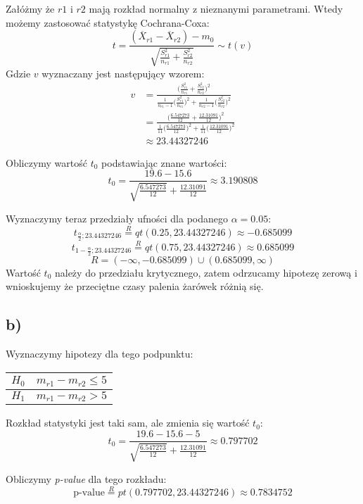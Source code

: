 \documentclass{article}
\begin{document}
Załóżmy że $r1$ i $r2$ mają rozkład normalny z nieznanymi parametrami. Wtedy możemy zastosować statystykę Cochrana-Coxa:
\[ t = \frac{(\overline{X}_{r1} - \overline{X}_{r2}) - m_0}{\sqrt{ \frac{S_{r1}^2}{n_{r1}} + \frac{S_{r2}^2}{n_{r2}} }} \sim t(v) \]
Gdzie $v$ wyznaczany jest następujący wzorem:
\begin{align*}
v & = \frac{ \Big( \frac{S_{r1}^2}{n_{r1}} + \frac{S_{r2}^2}{n_{r2}} \Big)^2 }{\frac{1}{n_{r1}-1} \Big( \frac{S_{r1}^2}{n_{r1}} \Big)^2 + \frac{1}{n_{r2}-1} \Big( \frac{S_{r2}^2}{n_{r2}} \Big)^2 } \\
& = \frac{ \Big( \frac{6.547273}{12} + \frac{12.31091}{12} \Big)^2 }{\frac{1}{11} \Big( \frac{6.547273}{12} \Big)^2 + \frac{1}{11} \Big( \frac{12.31091}{12} \Big)^2 } \\
& \approx 23.44327246
\end{align*}

Obliczymy wartość $t_0$ podstawiając znane wartości:
\[ t_0 = \frac{19.6 - 15.6}{\sqrt{ \frac{6.547273}{12}} + \frac{12.31091}{12}}  \approx 3.190808 \]

Wyznaczymy teraz przedziały ufności dla podanego $\alpha = 0.05$:
\[ t_{\frac{\alpha}{2};23.44327246} \overset{R}{=} qt(0.25, 23.44327246) \approx -0.685099 \]
\[ t_{1 - \frac{\alpha}{2}; 23.44327246} \overset{R}{=} qt(0.75, 23.44327246) \approx 0.685099 \]
\[ R = ( -\infty, -0.685099 ) \cup (0.685099, \infty) \]
Wartość $t_0$ należy do przedziału krytycznego, zatem odrzucamy hipotezę zerową i wnioskujemy że przeciętne czasy palenia żarówek różnią się.

\subsection{b)}
Wyznaczymy hipotezy dla tego podpunktu:
\begin{center} \begin{tabular}{|c|c|} \hline
$H_0$ & $m_{r1} - m_{r2} \leq 5$ \\ \hline
$H_1$ & $m_{r1} - m_{r2} > 5$ \\ \hline
\end{tabular} \end{center}

Rozkład statystyki jest taki sam, ale zmienia się wartość $t_0$:
\[ t_0 = \frac{19.6 - 15.6 - 5}{\sqrt{ \frac{6.547273}{12}} + \frac{12.31091}{12}} \approx 0.797702 \]

Obliczymy \textit{p-value} dla tego rozkładu:
\[ \text{p-value} \overset{R}{=} pt(0.797702, 23.44327246) \approx 0.7834752 \]
\end{document}
